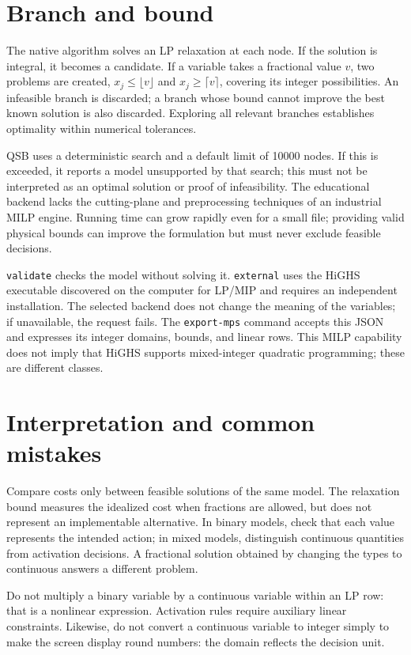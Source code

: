 \section{Branch and bound}
The native algorithm solves an LP relaxation at each node. If the solution
is integral, it becomes a candidate. If a variable takes a fractional value \(v\),
two problems are created, \(x_j\leq\lfloor v\rfloor\) and
\(x_j\geq\lceil v\rceil\), covering its integer possibilities. An infeasible
branch is discarded; a branch whose bound cannot improve the best known
solution is also discarded. Exploring all relevant branches establishes
optimality within numerical tolerances.

QSB uses a deterministic search and a default limit of 10000 nodes.
If this is exceeded, it reports a model unsupported by that search; this
must not be interpreted as an optimal solution or proof of infeasibility.
The educational backend lacks the cutting-plane and preprocessing techniques
of an industrial MILP engine. Running time can grow rapidly even for a small
file; providing valid physical bounds can improve the formulation but must
never exclude feasible decisions.

\texttt{validate} checks the model without solving it.
\texttt{external} uses the HiGHS executable discovered on the computer for LP/MIP
and requires an independent installation. The selected backend does not change
the meaning of the variables; if unavailable, the request fails.
The \texttt{export-mps} command accepts this JSON and expresses its integer
domains, bounds, and linear rows. This MILP capability does not imply that
HiGHS supports mixed-integer quadratic programming; these are different classes.

\section{Interpretation and common mistakes}
Compare costs only between feasible solutions of the same model. The
relaxation bound measures the idealized cost when fractions are allowed,
but does not represent an implementable alternative. In binary models, check
that each value represents the intended action; in mixed models, distinguish
continuous quantities from activation decisions. A fractional solution obtained
by changing the types to continuous answers a different problem.

Do not multiply a binary variable by a continuous variable within an LP row:
that is a nonlinear expression. Activation rules require auxiliary linear
constraints. Likewise, do not convert a continuous variable to integer simply
to make the screen display round numbers: the domain reflects the decision
unit.

